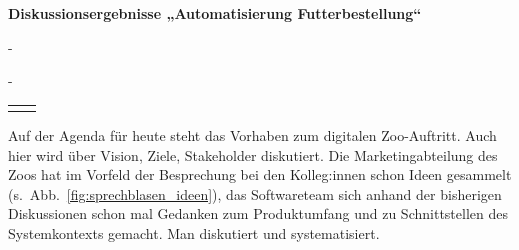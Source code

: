 \vspace{\baselineskip}

\textbf{Diskussionsergebnisse „Automatisierung Futterbestellung“}

{ %
	\renewcommand{\sttpKarteikarteSkalierungsfaktor}{0.85}
	
	\begin{addmargin*}[0cm]{-\marginparwidth}
	\begin{addmargin*}[0cm]{-\marginparsep}

	\begin{center}
		\begin{tabular}{ p{8.2cm} p{8.2cm} }
			\vspace{-0.5cm}
			\begin{center}
				
			\end{center}
	
			\vspace{-0.5cm}
			\begin{center}
				
			\end{center}
			&
			\vspace{-0.5cm}
			\begin{center}
				
			\end{center}
			\\
		\end{tabular}
	\end{center}

	\end{addmargin*}
	\end{addmargin*}
} %

\clearpage


Auf der Agenda für heute steht das Vorhaben zum digitalen Zoo-Auftritt. Auch hier wird über Vision, Ziele, Stakeholder diskutiert. Die Marketingabteilung des Zoos hat im Vorfeld der Besprechung bei den Kolleg:innen schon Ideen gesammelt (s.~Abb.~\ref{fig:sprechblasen_ideen}), das Softwareteam sich anhand der bisherigen Diskussionen schon mal Gedanken zum Produktumfang und zu Schnittstellen des Systemkontexts gemacht. Man diskutiert und systematisiert.

